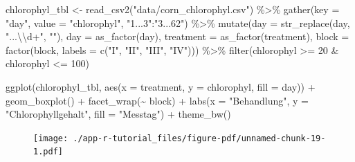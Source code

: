 \documentclass[
  letterpaper,
  DIV=11,
  oneside]{scrreport}
\newenvironment{Shaded}{\begin{snugshade}}{\end{snugshade}}
\newcommand{\AttributeTok}[1]{\textcolor[rgb]{0.40,0.45,0.13}{#1}}
\newcommand{\DecValTok}[1]{\textcolor[rgb]{0.68,0.00,0.00}{#1}}
\newcommand{\FunctionTok}[1]{\textcolor[rgb]{0.28,0.35,0.67}{#1}}
\newcommand{\NormalTok}[1]{\textcolor[rgb]{0.00,0.23,0.31}{#1}}
\newcommand{\OtherTok}[1]{\textcolor[rgb]{0.00,0.23,0.31}{#1}}
\newcommand{\SpecialCharTok}[1]{\textcolor[rgb]{0.37,0.37,0.37}{#1}}
\newcommand{\StringTok}[1]{\textcolor[rgb]{0.13,0.47,0.30}{#1}}
\begin{document}
\begin{Shaded}
\begin{Highlighting}[]
\NormalTok{chlorophyl\_tbl }\OtherTok{\textless{}{-}} \FunctionTok{read\_csv2}\NormalTok{(}\StringTok{"data/corn\_chlorophyl.csv"}\NormalTok{) }\SpecialCharTok{\%\textgreater{}\%} 
  \FunctionTok{gather}\NormalTok{(}\AttributeTok{key =} \StringTok{"day"}\NormalTok{, }\AttributeTok{value =} \StringTok{"chlorophyl"}\NormalTok{, }\StringTok{"1...3"}\SpecialCharTok{:}\StringTok{"3...62"}\NormalTok{) }\SpecialCharTok{\%\textgreater{}\%} 
  \FunctionTok{mutate}\NormalTok{(}\AttributeTok{day =} \FunctionTok{str\_replace}\NormalTok{(day, }\StringTok{"...}\SpecialCharTok{\textbackslash{}\textbackslash{}}\StringTok{d+"}\NormalTok{, }\StringTok{""}\NormalTok{),}
         \AttributeTok{day =} \FunctionTok{as\_factor}\NormalTok{(day),}
         \AttributeTok{treatment =} \FunctionTok{as\_factor}\NormalTok{(treatment),}
         \AttributeTok{block =} \FunctionTok{factor}\NormalTok{(block, }\AttributeTok{labels =} \FunctionTok{c}\NormalTok{(}\StringTok{"I"}\NormalTok{, }\StringTok{"II"}\NormalTok{, }\StringTok{"III"}\NormalTok{, }\StringTok{"IV"}\NormalTok{))) }\SpecialCharTok{\%\textgreater{}\%} 
  \FunctionTok{filter}\NormalTok{(chlorophyl }\SpecialCharTok{\textgreater{}=} \DecValTok{20} \SpecialCharTok{\&}\NormalTok{ chlorophyl }\SpecialCharTok{\textless{}=} \DecValTok{100}\NormalTok{)}
\end{Highlighting}
\end{Shaded}

\begin{Shaded}
\begin{Highlighting}[]
\FunctionTok{ggplot}\NormalTok{(chlorophyl\_tbl, }\FunctionTok{aes}\NormalTok{(}\AttributeTok{x =}\NormalTok{ treatment, }\AttributeTok{y =}\NormalTok{ chlorophyl, }\AttributeTok{fill =}\NormalTok{ day)) }\SpecialCharTok{+}
  \FunctionTok{geom\_boxplot}\NormalTok{() }\SpecialCharTok{+}
  \FunctionTok{facet\_wrap}\NormalTok{(}\SpecialCharTok{\textasciitilde{}}\NormalTok{ block) }\SpecialCharTok{+}
  \FunctionTok{labs}\NormalTok{(}\AttributeTok{x =} \StringTok{"Behandlung"}\NormalTok{, }\AttributeTok{y =} \StringTok{"Chlorophyllgehalt"}\NormalTok{, }\AttributeTok{fill =} \StringTok{"Messtag"}\NormalTok{) }\SpecialCharTok{+}
  \FunctionTok{theme\_bw}\NormalTok{()}
\end{Highlighting}
\end{Shaded}

\begin{figure}[H]

{\centering \texttt{[image: ./app-r-tutorial\_files/figure-pdf/unnamed-chunk-19-1.pdf]}

}

\end{figure}
\end{document}
